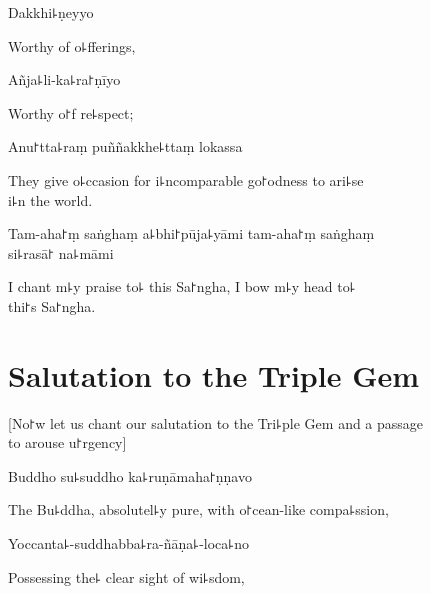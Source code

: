 Dakkhi꜕ṇeyyo

\begin{english}
  Worthy of o꜕fferings,
\end{english}

Añja꜕li-ka꜕ra꜓ṇīyo

\begin{english}
  Worthy o꜓f re꜕spect;
\end{english}

Anu꜓tta꜕raṃ puññakkhe꜕ttaṃ lokassa

\begin{english}
  They give o꜕ccasion for i꜕ncomparable go꜓odness to ari꜕se \\i꜕n the world.
\end{english}

Tam-aha꜓ṃ saṅghaṃ a꜕bhi꜓pūja꜕yāmi tam-aha꜓ṃ saṅghaṃ \\si꜕rasā꜓ na꜕māmi

\begin{english}
  I chant m꜕y praise to꜕ this Sa꜓ngha, I bow m꜕y head to꜕\\ thi꜓s Sa꜓ngha.
\end{english}

\clearpage

\chapter{Salutation to the Triple Gem}              %

\begin{leader}
\end{leader}

\begin{english}
  [No꜓w let us chant our salutation to the Tri꜕ple Gem and a passage \\to arouse u꜓rgency]
\end{english}

Buddho su꜕suddho ka꜕ruṇāmaha꜓ṇṇavo

\begin{english}
  The Bu꜕ddha, absolutel꜕y pure, with o꜓cean-like compa꜕ssion,
\end{english}

Yoccanta꜕-suddhabba꜕ra-ñāṇa꜕-loca꜕no

\begin{english}
  Possessing the꜕ clear sight of wi꜕sdom,
\end{english}

